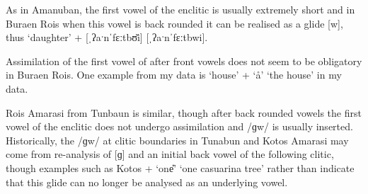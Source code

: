 \begin{exe}
	\label{ex:Buraen}
\end{exe}

As in Amanuban, the first vowel of the enclitic 
is usually extremely short and in Buraen Ro{\Q}is when this vowel is back rounded 
it can be realised as a glide [w],
thus  `daughter' +  {\ra}
 [ˌʔaˑnˈfɛːtbʊ̆i] {\tl} [ˌʔaˑnˈfɛːtbwi]. 

Assimilation of the first vowel of  after front
vowels does not seem to be obligatory in Buraen Ro{\Q}is.
One example from my data is  `house' + 
`{\aa}' {\ra}  `the house' in my data.

Ro{\Q}is Amarasi from Tunbaun is similar,
though after back rounded vowels the first vowel
of the enclitic does not undergo assimilation and /ɡw/ is usually inserted.
Historically, the /ɡw/ at clitic boundaries in 
Tunabun and Kotos Amarasi may come from re-analysis of
[ɡ] and an initial back vowel of the following clitic,
though examples such as Kotos  + 
`one{\U}' {\ra}  `one casuarina tree'
rather than  indicate that this
glide can no longer be analysed as an underlying vowel.

